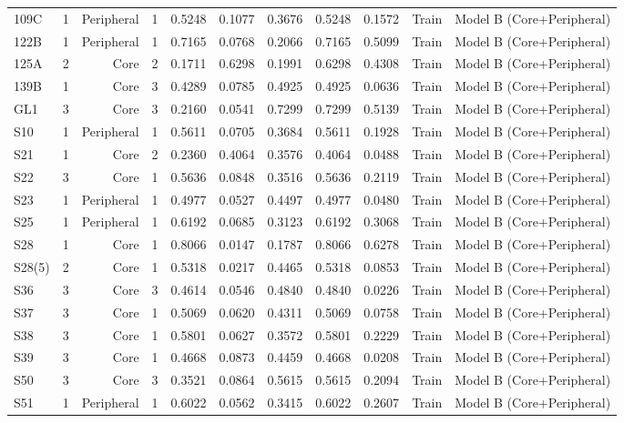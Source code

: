 {\begin{longtable}{lrrrrrrrrrr}
  109C & 1 & Peripheral & 1 & 0.5248 & 0.1077 & 0.3676 & 0.5248 & 0.1572 & Train & Model B (Core+Peripheral) \\
  122B & 1 & Peripheral & 1 & 0.7165 & 0.0768 & 0.2066 & 0.7165 & 0.5099 & Train & Model B (Core+Peripheral) \\
  125A & 2 & Core & 2 & 0.1711 & 0.6298 & 0.1991 & 0.6298 & 0.4308 & Train & Model B (Core+Peripheral) \\
  139B & 1 & Core & 3 & 0.4289 & 0.0785 & 0.4925 & 0.4925 & 0.0636 & Train & Model B (Core+Peripheral) \\
  GL1 & 3 & Core & 3 & 0.2160 & 0.0541 & 0.7299 & 0.7299 & 0.5139 & Train & Model B (Core+Peripheral) \\
  S10 & 1 & Peripheral & 1 & 0.5611 & 0.0705 & 0.3684 & 0.5611 & 0.1928 & Train & Model B (Core+Peripheral) \\
  S21 & 1 & Core & 2 & 0.2360 & 0.4064 & 0.3576 & 0.4064 & 0.0488 & Train & Model B (Core+Peripheral) \\
  S22 & 3 & Core & 1 & 0.5636 & 0.0848 & 0.3516 & 0.5636 & 0.2119 & Train & Model B (Core+Peripheral) \\
  S23 & 1 & Peripheral & 1 & 0.4977 & 0.0527 & 0.4497 & 0.4977 & 0.0480 & Train & Model B (Core+Peripheral) \\
  S25 & 1 & Peripheral & 1 & 0.6192 & 0.0685 & 0.3123 & 0.6192 & 0.3068 & Train & Model B (Core+Peripheral) \\
  S28 & 1 & Core & 1 & 0.8066 & 0.0147 & 0.1787 & 0.8066 & 0.6278 & Train & Model B (Core+Peripheral) \\
  S28(5) & 2 & Core & 1 & 0.5318 & 0.0217 & 0.4465 & 0.5318 & 0.0853 & Train & Model B (Core+Peripheral) \\
  S36 & 3 & Core & 3 & 0.4614 & 0.0546 & 0.4840 & 0.4840 & 0.0226 & Train & Model B (Core+Peripheral) \\
  S37 & 3 & Core & 1 & 0.5069 & 0.0620 & 0.4311 & 0.5069 & 0.0758 & Train & Model B (Core+Peripheral) \\
  S38 & 3 & Core & 1 & 0.5801 & 0.0627 & 0.3572 & 0.5801 & 0.2229 & Train & Model B (Core+Peripheral) \\
  S39 & 3 & Core & 1 & 0.4668 & 0.0873 & 0.4459 & 0.4668 & 0.0208 & Train & Model B (Core+Peripheral) \\
  S50 & 3 & Core & 3 & 0.3521 & 0.0864 & 0.5615 & 0.5615 & 0.2094 & Train & Model B (Core+Peripheral) \\
  S51 & 1 & Peripheral & 1 & 0.6022 & 0.0562 & 0.3415 & 0.6022 & 0.2607 & Train & Model B (Core+Peripheral) \\

\end{longtable}}
